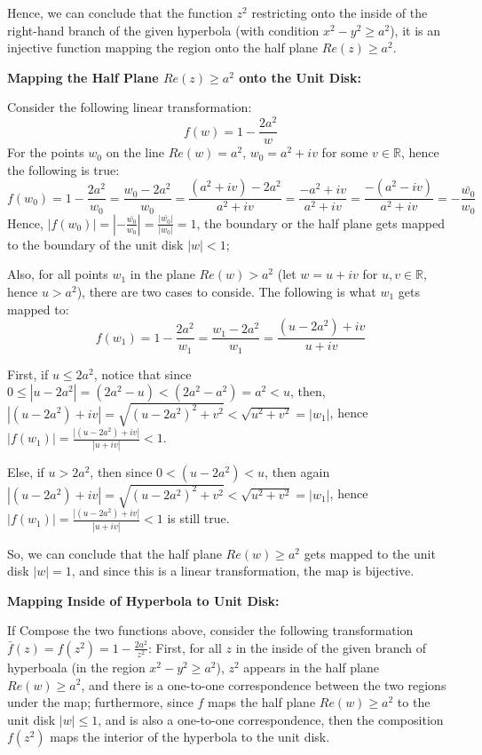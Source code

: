 \documentclass{article}
\begin{document}
Hence, we can conclude that the function $z^2$ restricting onto the inside of the right-hand branch of the given hyperbola (with condition $x^2-y^2\geq a^2$),
it is an injective function mapping the region onto the half plane $Re(z)\geq a^2$.

\hfill

\textbf{Mapping the Half Plane $Re(z)\geq a^2$ onto the Unit Disk:}

Consider the following linear transformation:
$$f(w)=1-\frac{2a^2}{w}$$
For the points $w_0$ on the line $Re(w)=a^2$, $w_0=a^2+iv$ for some $v\in\mathbb{R}$, hence the following is true:
$$f(w_0)=1-\frac{2a^2}{w_0}=\frac{w_0-2a^2}{w_0}=\frac{(a^2+iv)-2a^2}{a^2+iv}=\frac{-a^2+iv}{a^2+iv} = \frac{-(a^2-iv)}{a^2+iv} = -\frac{\bar{w_0}}{w_0}$$
Hence, $|f(w_0)|=\left|-\frac{\bar{w_0}}{w_0}\right|=\frac{|\bar{w_0}|}{|w_0|}=1$, the boundary or the half plane gets mapped to the boundary of the unit disk $|w|<1$;

Also, for all points $w_1$ in the plane $Re(w)>a^2$ (let $w=u+iv$ for $u,v\in \mathbb{R}$, hence $u>a^2$), there are two cases to conside.
The following is what $w_1$ gets mapped to:
$$f(w_1)=1-\frac{2a^2}{w_1}=\frac{w_1-2a^2}{w_1}=\frac{(u-2a^2)+iv}{u+iv}$$

First, if $u\leq 2a^2$, notice that since $0\leq |u-2a^2| = (2a^2-u) < (2a^2-a^2)=a^2 < u$, then, $|(u-2a^2)+iv|=\sqrt{(u-2a^2)^2+v^2}< \sqrt{u^2+v^2} = |w_1|$,
hence $|f(w_1)|=\frac{|(u-2a^2)+iv|}{|u+iv|} < 1$.

Else, if $u>2a^2$, then since $0<(u-2a^2)<u$, then again $|(u-2a^2)+iv|=\sqrt{(u-2a^2)^2+v^2}< \sqrt{u^2+v^2} = |w_1|$, hence $|f(w_1)|=\frac{|(u-2a^2)+iv|}{|u+iv|} < 1$ is still true.

So, we can conclude that the half plane $Re(w)\geq a^2$ gets mapped to the unit disk $|w|=1$, and since this is a linear transformation, the map is bijective.

\hfill

\textbf{Mapping Inside of Hyperbola to Unit Disk:}

If Compose the two functions above, consider the following transformation $\bar{f}(z)=f(z^2)=1-\frac{2a^2}{z^2}$:
First, for all $z$ in the inside of the given branch of hyperboala (in the region $x^2-y^2\geq a^2$), $z^2$ appears in the half plane $Re(w)\geq a^2$, and there is a one-to-one correspondence between the two regions under the map;
furthermore, since $f$ maps the half plane $Re(w)\geq a^2$ to the unit disk $|w|\leq 1$, and is also a one-to-one correspondence, then the composition $f(z^2)$ maps the interior of the hyperbola to the unit disk.
\end{document}
